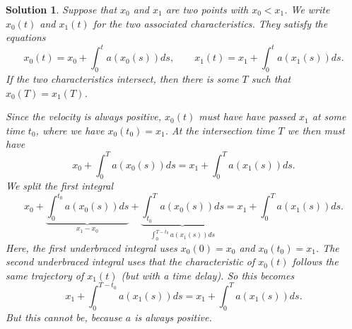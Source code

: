 \documentclass[10pt,letterpaper]{article}
\theoremstyle{break}
\newtheorem{solution}{Solution}
\begin{document}
\begin{solution}
    Suppose that $x_0$ and $x_1$ are two points with $x_0 < x_1$. 
    We write $x_0(t)$ and $x_1(t)$ for the two associated characteristics. 
    They satisfy the equations 
    $$
        x_0(t) = x_0 + \int_0^t a( x_0(s) ) ds,
        \qquad
        x_1(t) = x_1 + \int_0^t a( x_1(s) ) ds.
    $$
    If the two characteristics intersect, 
    then there is some $T$ such that $x_0(T) = x_1(T)$.

    Since the velocity is always positive, $x_0(t)$ must have have passed $x_1$ at some time $t_0$, where we have $x_0(t_0) = x_1$.
    At the intersection time $T$ we then must have 
    $$
        x_0 + \int_0^T a( x_0(s) ) ds
        =
        x_1 + \int_0^T a( x_1(s) ) ds.
    $$
    We split the first integral
    $$
        x_0
        +
        \underbrace{ \int_0^{t_0} a( x_0(s) ) ds }_{x_1 - x_0}
        +
        \underbrace{ \int_{t_0}^T a( x_0(s) ) ds }_{\int_0^{T-t_0} a( x_1(s) ) ds}
        =
        x_1
        +
        \int_0^T a( x_1(s) ) ds.
    $$
    Here, the first underbraced integral uses $x_0(0)=x_0$ and $x_0(t_0)=x_1$.
    The second underbraced integral uses that the characteristic of $x_0(t)$ follows the same trajectory of $x_1(t)$ (but with a time delay).
    So this becomes 
    $$
        x_1
        +
        \int_0^{T-t_0} a( x_1(s) ) ds 
        =
        x_1
        +
        \int_0^T a( x_1(s) ) ds.
    $$
    But this cannot be, because $a$ is always positive. 
\end{solution}
    
\end{document}
